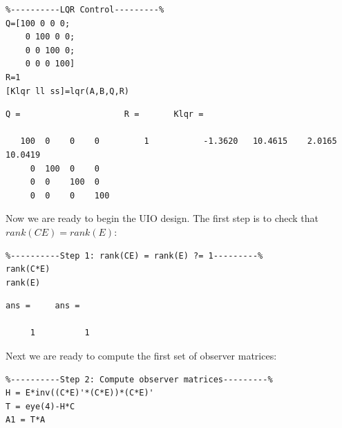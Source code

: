 \documentclass{amsart}
\theoremstyle{definition}
\theoremstyle{remark}
\numberwithin{equation}{section}
\begin{document}
    \begin{verbatim}
%----------LQR Control---------%
Q=[100 0 0 0;
    0 100 0 0;
    0 0 100 0;
    0 0 0 100]
R=1
[Klqr ll ss]=lqr(A,B,Q,R)
\end{verbatim}

        \color{lightgray} \begin{verbatim}
Q =                     R =       Klqr =

   100  0    0    0         1           -1.3620   10.4615    2.0165   10.0419
     0  100  0    0
     0  0    100  0
     0  0    0    100

\end{verbatim} \color{black}
Now we are ready to begin the UIO design.  The first step is to check that $rank(CE) = rank(E)$:
    \begin{verbatim}
%----------Step 1: rank(CE) = rank(E) ?= 1---------%
rank(C*E)
rank(E)
\end{verbatim}

        \color{lightgray} \begin{verbatim}
ans =     ans =

     1          1
\end{verbatim} \color{black}
Next we are ready to compute the first set of observer matrices:
    \begin{verbatim}
%----------Step 2: Compute observer matrices---------%
H = E*inv((C*E)'*(C*E))*(C*E)'
T = eye(4)-H*C
A1 = T*A
\end{verbatim}
\end{document}

